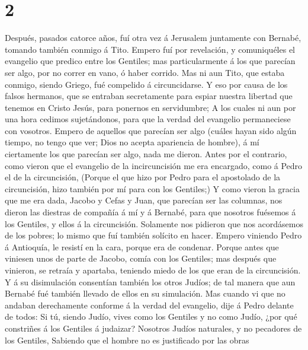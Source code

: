 \hypertarget{section-1}{%
\section{2}\label{section-1}}

 Después, pasados catorce años, fuí otra vez á Jerusalem
juntamente con Bernabé, tomando también conmigo á Tito. 
Empero fuí por revelación, y comuniquéles el evangelio que predico entre
los Gentiles; mas particularmente á los que parecían ser algo, por no
correr en vano, ó haber corrido.  Mas ni aun Tito, que
estaba conmigo, siendo Griego, fué compelido á circuncidarse.
 Y eso por causa de los falsos hermanos, que se entraban
secretamente para espiar nuestra libertad que tenemos en Cristo Jesús,
para ponernos en servidumbre;  A los cuales ni aun por una
hora cedimos sujetándonos, para que la verdad del evangelio permaneciese
con vosotros.  Empero de aquellos que parecían ser algo
(cuáles hayan sido algún tiempo, no tengo que ver; Dios no acepta
apariencia de hombre), á mí ciertamente los que parecían ser algo, nada
me dieron.  Antes por el contrario, como vieron que el
evangelio de la incircuncisión me era encargado, como á Pedro el de la
circuncisión,  (Porque el que hizo por Pedro para el
apostolado de la circuncisión, hizo también por mí para con los
Gentiles;)  Y como vieron la gracia que me era dada,
Jacobo y Cefas y Juan, que parecían ser las columnas, nos dieron las
diestras de compañía á mí y á Bernabé, para que nosotros fuésemos á los
Gentiles, y ellos á la circuncisión.  Solamente nos
pidieron que nos acordásemos de los pobres; lo mismo que fuí también
solícito en hacer.  Empero viniendo Pedro á Antioquía, le
resistí en la cara, porque era de condenar.  Porque antes
que viniesen unos de parte de Jacobo, comía con los Gentiles; mas
después que vinieron, se retraía y apartaba, teniendo miedo de los que
eran de la circuncisión.  Y á su disimulación consentían
también los otros Judíos; de tal manera que aun Bernabé fué también
llevado de ellos en su simulación.  Mas cuando vi que no
andaban derechamente conforme á la verdad del evangelio, dije á Pedro
delante de todos: Si tú, siendo Judío, vives como los Gentiles y no como
Judío, ¿por qué constriñes á los Gentiles á judaizar? 
Nosotros Judíos naturales, y no pecadores de los Gentiles,
 Sabiendo que el hombre no es justificado por las obras
